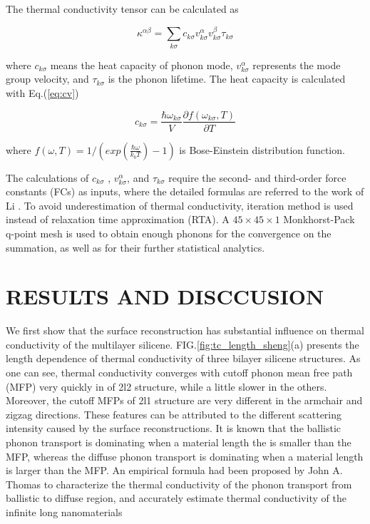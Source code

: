 \documentclass[aps,prb,twocolumn,showpacs,amsmath,amssymb]{revtex4-1}
\begin{document}
The thermal conductivity tensor can be calculated as

\begin{equation}
  \kappa^{\alpha\beta} = \sum_{k \sigma}{c_{k \sigma}v^{\alpha}_{k \sigma}v^{\beta}_{k \sigma}\tau_{k \sigma}} \label{eq:kappasum}
\end{equation}

where $c_{k \sigma}$ means the heat capacity of phonon mode,  $v_{k \sigma}^{\alpha}$ represents the mode group velocity, and $\tau_{k \sigma}$ is the phonon lifetime. The heat capacity is calculated with Eq.(\ref{eq:cv})

\begin{equation}
  c_{k \sigma}=\frac{\hbar \omega_{k \sigma} }{V} \frac{\partial f(\omega_{k \sigma},T)}{\partial T} \label{eq:cv}
\end{equation}

where $ f(\omega,T)=1/(exp(\frac{\hbar \omega}{k_b T})-1)$ is Bose-Einstein distribution function.

The calculations of $c_{k\sigma}$ , $v_{k \sigma}^{\alpha}$, and $\tau_{k\sigma}$ require the second- and third-order force constants (FCs) as inputs, where the detailed formulas are referred to the work of  Li \cite{Li2014}. To avoid underestimation of thermal conductivity, iteration method is used instead of relaxation time approximation (RTA). A $45\times 45 \times 1$ Monkhorst-Pack q-point mesh is used to obtain enough phonons for the convergence on the summation, as well as for their further statistical analytics.

\section{RESULTS AND DISCCUSION}

We first show that the surface reconstruction has substantial influence on thermal conductivity of the multilayer silicene.
FIG.\ref{fig:tc_length_sheng}(a) presents the length dependence of thermal conductivity of three bilayer silicene structures.
As one can see, thermal conductivity converges with cutoff phonon mean free path (MFP) very quickly in of 2l2  structure, while a little slower in the others. Moreover, the cutoff MFPs of 2l1 structure are very different in the armchair and zigzag directions. These features can be attributed to the different scattering intensity caused by the surface reconstructions.
It is known that the ballistic phonon transport is dominating  when a material length the is smaller than the MFP,  whereas the diffuse phonon transport is  dominating when a material length is larger than the MFP.
An empirical formula had been proposed by John A. Thomas\cite{Thomas2010}  to characterize the thermal conductivity of the phonon transport from ballistic to diffuse region, and accurately estimate thermal conductivity of the infinite long nanomaterials
\end{document}
